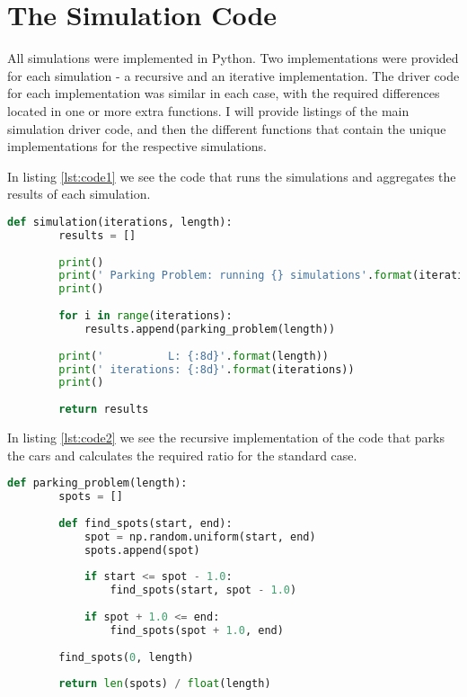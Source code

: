 
\chapter{The Simulation Code}

All simulations were implemented in Python. Two implementations were provided 
for each simulation - a recursive and an iterative implementation. The driver 
code for each implementation was similar in each case, with the required 
differences located in one or more extra functions. I will provide listings 
of the main simulation driver code, and then the different functions that 
contain the unique implementations for the respective simulations. \bigskip

In listing \ref{lst:code1} we see the code that runs the simulations and 
aggregates the results of each simulation. \bigskip

\begin{lstlisting}[language=python,caption=Parking Problem - simulation driver,label=lst:code1]
	def simulation(iterations, length):
		results = []
		
		print()
		print(' Parking Problem: running {} simulations'.format(iterations))
		print()
	
		for i in range(iterations):
			results.append(parking_problem(length))
	
		print('          L: {:8d}'.format(length))
		print(' iterations: {:8d}'.format(iterations))
		print()
		
		return results

\end{lstlisting} \bigskip

In listing \ref{lst:code2} we see the recursive implementation of the code 
that parks the cars and calculates the required ratio for the standard case. \bigskip

\begin{lstlisting}[language=python,caption=Parking Problem - Recursive - standard case,label=lst:code2]
	def parking_problem(length):
		spots = []
		
		def find_spots(start, end):
			spot = np.random.uniform(start, end)
			spots.append(spot)
			
			if start <= spot - 1.0:
				find_spots(start, spot - 1.0)
			
			if spot + 1.0 <= end:
				find_spots(spot + 1.0, end)
		
		find_spots(0, length)
		
		return len(spots) / float(length)

\end{lstlisting}  \bigskip

